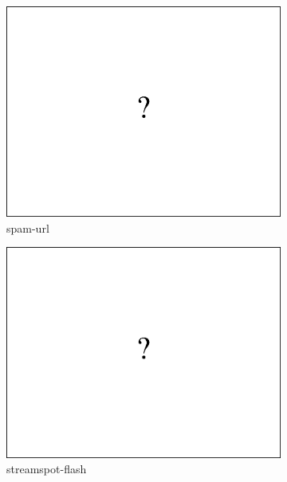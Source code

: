 \documentclass[11pt,onecolumn]{article}
\begin{document}
\begin{figure}[ht!]
\begin{subfigure}[t]{0.24\textwidth}
        \includegraphics[width=\linewidth]{fig/ap_over_time_placeholder.pdf}
        \caption{spam-url}
    \end{subfigure}
		\hfill
    \begin{subfigure}[t]{0.24\textwidth}
        \centering
        \includegraphics[width=\linewidth]{fig/ap_over_time_placeholder.pdf}
        \caption{streamspot-flash}
    \end{subfigure}\\
    \begin{subfigure}[t]{0.24\textwidth}
        \centering

\end{subfigure}
\end{figure}
\end{document}
